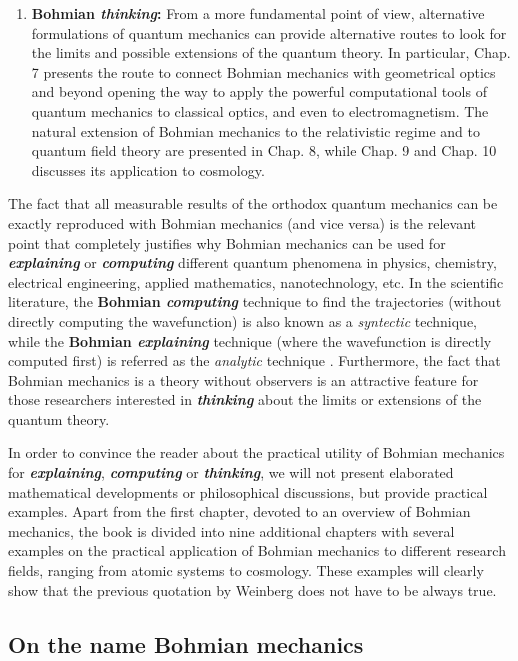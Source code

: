 \documentclass[nofootinbib, secnumarabic, amsmath, nobibnotes,11pt,aps,pra, floatfix]{revtex4-1}
\begin{document}
\begin{enumerate}
\item \textbf{Bohmian \emph{thinking}:} From a more fundamental point of view, alternative formulations of quantum mechanics can provide alternative routes to look for the limits and possible extensions of the quantum theory. In particular, Chap. 7 presents the route to connect Bohmian mechanics with geometrical optics and beyond opening the way to apply the powerful computational tools of quantum mechanics to classical optics, and even to electromagnetism. The natural extension of Bohmian mechanics to the relativistic regime and to quantum field theory are presented in Chap. 8, while Chap. 9 and Chap. 10 discusses its application to cosmology.
\end{enumerate}

The fact that all measurable results of the orthodox quantum mechanics can be exactly reproduced with Bohmian mechanics (and vice versa) is the relevant point that completely justifies why Bohmian mechanics can be used for \textbf{\emph{explaining}} or \textbf{\emph{computing}} different quantum phenomena in physics, chemistry, electrical engineering, applied mathematics, nanotechnology, etc. In the scientific literature, the \textbf{Bohmian \emph{computing}} technique to find the trajectories (without directly computing the wavefunction) is also known as a \emph{syntectic} technique, while the \textbf{Bohmian \emph{explaining}} technique (where the wavefunction is directly computed first) is referred as the \emph{analytic} technique \cite{om.wyatt2005}. Furthermore, the fact that Bohmian mechanics is a theory without observers is an attractive feature for those researchers interested in \textbf{\emph{thinking}} about the limits or extensions of the quantum theory.

In order to convince the reader about the practical utility of Bohmian mechanics for \textbf{\emph{explaining}}, \textbf{\emph{computing}} or \textbf{\emph{thinking}}, we will not present elaborated mathematical developments or philosophical discussions, but provide practical examples. Apart from the first chapter, devoted to an overview of Bohmian mechanics, the book is divided into nine additional chapters with several examples on the practical application of Bohmian mechanics to different research fields, ranging from atomic systems to cosmology. These examples will clearly show that the previous quotation by Weinberg does not have to be always true.


\subsection{On the name Bohmian mechanics}
\end{document}
